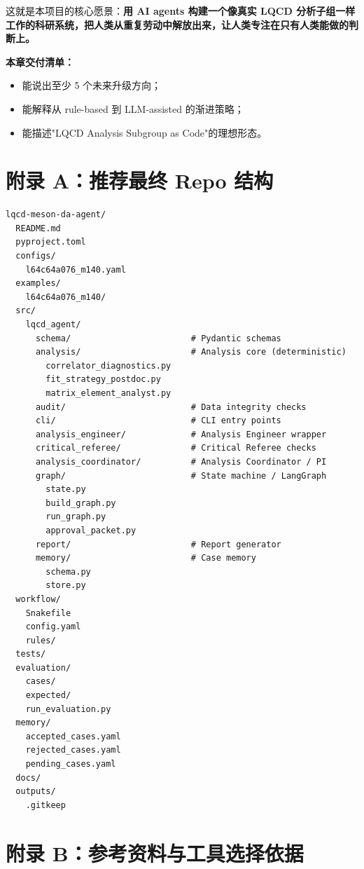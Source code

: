 \documentclass[11pt,a4paper,fontset=fandol]{ctexart}
\begin{document}
这就是本项目的核心愿景：\textbf{用 AI agents 构建一个像真实 LQCD 分析子组一样工作的科研系统，把人类从重复劳动中解放出来，让人类专注在只有人类能做的判断上。}

\textbf{本章交付清单：}
\begin{itemize}
  \item 能说出至少 5 个未来升级方向；
  \item 能解释从 rule-based 到 LLM-assisted 的渐进策略；
  \item 能描述"LQCD Analysis Subgroup as Code"的理想形态。
\end{itemize}

\newpage


\section*{附录 A：推荐最终 Repo 结构}

\begin{lstlisting}
lqcd-meson-da-agent/
  README.md
  pyproject.toml
  configs/
    l64c64a076_m140.yaml
  examples/
    l64c64a076_m140/
  src/
    lqcd_agent/
      schema/                        # Pydantic schemas
      analysis/                      # Analysis core (deterministic)
        correlator_diagnostics.py
        fit_strategy_postdoc.py
        matrix_element_analyst.py
      audit/                         # Data integrity checks
      cli/                           # CLI entry points
      analysis_engineer/             # Analysis Engineer wrapper
      critical_referee/              # Critical Referee checks
      analysis_coordinator/          # Analysis Coordinator / PI
      graph/                         # State machine / LangGraph
        state.py
        build_graph.py
        run_graph.py
        approval_packet.py
      report/                        # Report generator
      memory/                        # Case memory
        schema.py
        store.py
  workflow/
    Snakefile
    config.yaml
    rules/
  tests/
  evaluation/
    cases/
    expected/
    run_evaluation.py
  memory/
    accepted_cases.yaml
    rejected_cases.yaml
    pending_cases.yaml
  docs/
  outputs/
    .gitkeep
\end{lstlisting}

\section*{附录 B：参考资料与工具选择依据}
\end{document}
